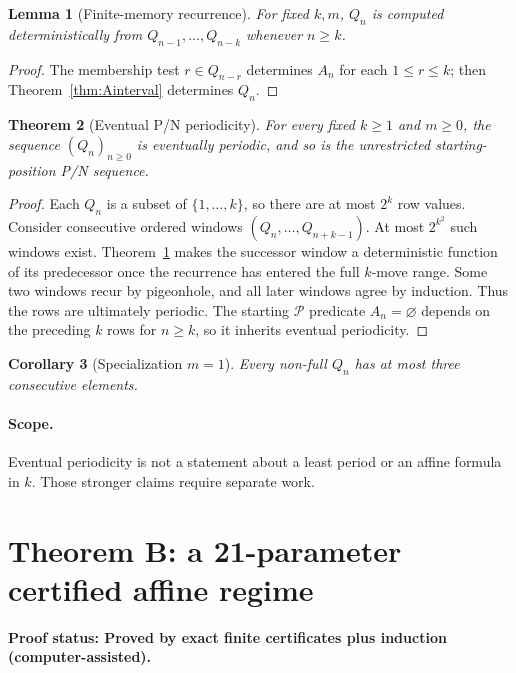 \documentclass[11pt]{article}
\newtheorem{theorem}{Theorem}[section]
\newtheorem{lemma}[theorem]{Lemma}
\newtheorem{corollary}[theorem]{Corollary}
\newcommand{\Pset}{\mathcal{P}}
\newcommand{\statusmachine}{\textbf{Proof status: Proved by exact finite certificates plus induction (computer-assisted).}}
\begin{document}
\begin{lemma}[Finite-memory recurrence]\label{lem:memory}
For fixed $k,m$, $Q_n$ is computed deterministically from $Q_{n-1},\ldots,Q_{n-k}$ whenever $n\ge k$.
\end{lemma}
\begin{proof}The membership test $r\in Q_{n-r}$ determines $A_n$ for each $1\le r\le k$; then Theorem~\ref{thm:Ainterval} determines $Q_n$.\end{proof}

\begin{theorem}[Eventual P/N periodicity]\label{thm:Aperiod}
For every fixed $k\ge1$ and $m\ge0$, the sequence $(Q_n)_{n\ge0}$ is eventually periodic, and so is the unrestricted starting-position P/N sequence.
\end{theorem}
\begin{proof}
Each $Q_n$ is a subset of $\{1,\ldots,k\}$, so there are at most $2^k$ row values. Consider consecutive ordered windows $(Q_n,\ldots,Q_{n+k-1})$. At most $2^{k^2}$ such windows exist. Theorem~\ref{lem:memory} makes the successor window a deterministic function of its predecessor once the recurrence has entered the full $k$-move range. Some two windows recur by pigeonhole, and all later windows agree by induction. Thus the rows are ultimately periodic. The starting $\Pset$ predicate $A_n=\varnothing$ depends on the preceding $k$ rows for $n\ge k$, so it inherits eventual periodicity.
\end{proof}
\begin{corollary}[Specialization $m=1$] Every non-full $Q_n$ has at most three consecutive elements.\end{corollary}
\paragraph{Scope.} Eventual periodicity is not a statement about a least period or an affine formula in $k$. Those stronger claims require separate work.

\section{Theorem B: a 21-parameter certified affine regime}\label{sec:B}
\statusmachine
\end{document}
